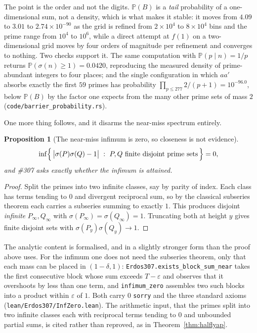 \documentclass[11pt]{article}
\newtheorem{proposition}[theorem]{Proposition}
\theoremstyle{definition}
\begin{document}
The point is the order and not the digits. $\mathbb{P}(B)$ is a \emph{tail} probability of a
one-dimensional sum, not a density, which is what makes it stable: it moves from $4.09$ to $3.01$ to
$2.74\times10^{-90}$ as the grid is refined from $2\times10^4$ to $8\times10^4$ bins and the prime
range from $10^4$ to $10^6$, while a direct attempt at $f(1)$ on a two-dimensional grid moves by four
orders of magnitude per refinement and converges to nothing. Two checks support it. The same
computation with $\mathbb{P}(p\mid n)=1/p$ returns $\mathbb{P}(\sigma(n)\ge1)=0.0420$, reproducing
the measured density of prime-abundant integers to four places; and the single configuration in which
$aa'$ absorbs exactly the first $59$ primes has probability $\prod_{p\le277}2/(p+1)=10^{-96.0}$,
below $\mathbb{P}(B)$ by the factor one expects from the many other prime sets of mass $2$
\textup{(\texttt{code/barrier\_probability.rs})}.

One more thing follows, and it disarms the near-miss spectrum entirely.

\begin{proposition}[The near-miss infimum is zero, so closeness is not evidence]\label{prop:infzero}
\[ \inf\Bigl\{\,\bigl|\sigma(P)\sigma(Q)-1\bigr|\ :\ P,Q\ \text{finite disjoint prime sets}\,\Bigr\}=0, \]
and \#307 asks exactly whether the infimum is attained.
\end{proposition}
\begin{proof}
Split the primes into two infinite classes, say by parity of index. Each class has terms tending to
$0$ and divergent reciprocal sum, so by the classical subseries theorem each carries a subseries
summing to exactly $1$. This produces disjoint \emph{infinite} $P_\infty,Q_\infty$ with
$\sigma(P_\infty)=\sigma(Q_\infty)=1$. Truncating both at height $y$ gives finite disjoint sets with
$\sigma(P_y)\sigma(Q_y)\to1$.
\end{proof}

The analytic content is formalised, and in a slightly stronger form than the proof above uses. For
the infimum one does not need the subseries theorem, only that each mass can be placed in
$(1-\delta,1)$: \texttt{Erdos307.exists\_block\_sum\_near} takes the first consecutive block whose
sum exceeds $T-\varepsilon$ and observes that it overshoots by less than one term, and
\texttt{infimum\_zero} assembles two such blocks into a product within $\varepsilon$ of $1$. Both
carry $0$ \texttt{sorry} and the three standard axioms
\textup{(\texttt{lean/Erdos307/InfZero.lean})}. The arithmetic input, that the primes split into
two infinite classes each with reciprocal terms tending to $0$ and unbounded partial sums, is cited
rather than reproved, as in Theorem~\ref{thm:halflyap}.
\end{document}
